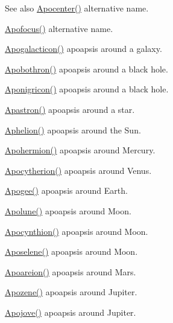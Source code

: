 \begin{DoxySeeAlso}{See also}
\mbox{\hyperlink{group___e_g_x_phys-_apoapsis_ga5e51a53e2f974264bada34f159fdc948}{Apocenter()}} alternative name. 

\mbox{\hyperlink{group___e_g_x_phys-_apoapsis_gaa53ac4e15bc6bc0fecf72eadb7a513e0}{Apofocus()}} alternative name. 

\mbox{\hyperlink{group___e_g_x_phys-_apoapsis_ga09b4c7d5e971dc28e1ba37f479958c27}{Apogalacticon()}} apoapsis around a galaxy. 

\mbox{\hyperlink{group___e_g_x_phys-_apoapsis_ga6fe084b9e69f47a5032b05aa8f6bf7ad}{Apobothron()}} apoapsis around a black hole. 

\mbox{\hyperlink{group___e_g_x_phys-_apoapsis_ga83e866e2f887ff8eafbc3971d4cab8be}{Aponigricon()}} apoapsis around a black hole. 

\mbox{\hyperlink{group___e_g_x_phys-_apoapsis_ga2fc1c406ce10f59b4f325150aecd279a}{Apastron()}} apoapsis around a star. 

\mbox{\hyperlink{group___e_g_x_phys-_apoapsis_ga77dadb4d082a441c8e85203c983722c7}{Aphelion()}} apoapsis around the Sun. 

\mbox{\hyperlink{group___e_g_x_phys-_apoapsis_gab002349e578241b3514f2212da9a7d48}{Apohermion()}} apoapsis around Mercury. 

\mbox{\hyperlink{group___e_g_x_phys-_apoapsis_ga59a284bb0bc11848c5b9ef1283033425}{Apocytherion()}} apoapsis around Venus. 

\mbox{\hyperlink{group___e_g_x_phys-_apoapsis_ga5cf587a051db28cae9e028a2b4955b0d}{Apogee()}} apoapsis around Earth. 

\mbox{\hyperlink{group___e_g_x_phys-_apoapsis_gacc68b49812c38394611e1ef3a8bf0e3e}{Apolune()}} apoapsis around Moon. 

\mbox{\hyperlink{group___e_g_x_phys-_apoapsis_ga557bb4d1a0ce7f17aaa8f8de469d4f52}{Apocynthion()}} apoapsis around Moon. 

\mbox{\hyperlink{group___e_g_x_phys-_apoapsis_gab61f3b2d6a5be3f62f5fb6dfdf802014}{Aposelene()}} apoapsis around Moon. 

\mbox{\hyperlink{group___e_g_x_phys-_apoapsis_ga8d8ac5814f653e229e1d463b432ffca5}{Apoareion()}} apoapsis around Mars. 

\mbox{\hyperlink{group___e_g_x_phys-_apoapsis_ga44d3dd8d8b350d053b25b7b1f1e15534}{Apozene()}} apoapsis around Jupiter. 

\mbox{\hyperlink{group___e_g_x_phys-_apoapsis_ga5a45d0a873514113aaa0adc95aefbbde}{Apojove()}} apoapsis around Jupiter. 


\end{DoxySeeAlso}
